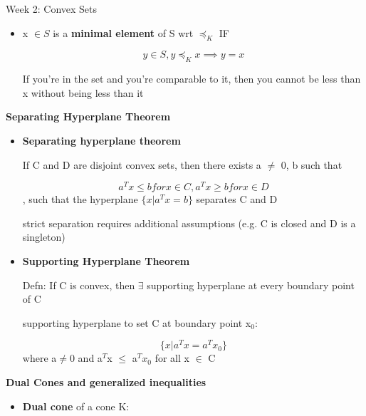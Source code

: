 \documentclass{article}
\begin{document}
\begin{homeworkProblemName}{{\LARGE Week 2: Convex Sets}}
\begin{problemAnswer}
{\begin{itemize}
        $$ y \in S \implies x \preceq_K y $$

        Means that x is the minimum if 1) comparable to every other element in
        the set, AND it is smaller than or equal to all of them (and is unique)

      \item x $\in S$ is a \textbf{minimal element} of S wrt $\preceq_K$ IF

        $$ y \in S, y \preceq_K x \implies y = x $$

        If you're in the set and you're comparable to it, then you cannot be
        less than x without being less than it

      \end{itemize}
    }\end{problemAnswer}


  \vspace{0.2 cm} \textbf{{\large Separating Hyperplane Theorem}}

  \begin{problemAnswer}{
      \begin{itemize}
      \item \textbf{Separating hyperplane theorem}

        If C and D are disjoint convex sets, then there exists a $\neq$ 0, b such
        that

        $$ a^T x \leq b for x \in C, a^T x \geq b for x \in D $$, such that the hyperplane
        $\{x | a^Tx = b\}$ separates C and D

        strict separation requires additional assumptions (e.g. C is closed and
        D is a singleton)

      \item \textbf{Supporting Hyperplane Theorem}

        Defn: If C is convex, then $\exists$ supporting hyperplane at every boundary
        point of C

        supporting hyperplane to set C at boundary point x$_0$:

        $$ \{x | a^Tx = a^Tx_0\} $$ where a$\neq$0 and a$^T$x $\leq$ a$^Tx_0$ for all
        x $\in$ C
      \end{itemize}
    }\end{problemAnswer}

  \clearpage

  \vspace{0.2 cm} \textbf{{\large Dual Cones and generalized inequalities}}

  \begin{problemAnswer}{
      \begin{itemize}
      \item \textbf{Dual cone} of a cone K:


\end{itemize}}
\end{problemAnswer}
\end{homeworkProblemName}
\end{document}
